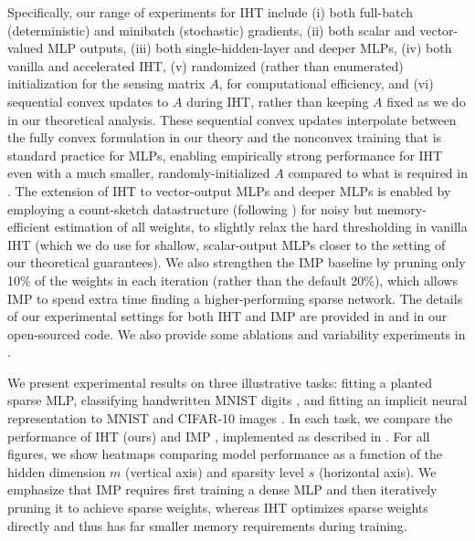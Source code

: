 \documentclass{article} %
\newcommand{\m}{\ensuremath{m}}
\newcommand{\1}{\ensuremath{{\sf (i)}}}
\newcommand{\2}{\ensuremath{{\sf (ii)}}}
\newcommand{\3}{\ensuremath{{\sf (iii)}}}
\newcommand{\4}{\ensuremath{{\sf (iv)}}}
\newcommand{\5}{\ensuremath{{\sf (v)}}}
\newcommand{\6}{\ensuremath{{\sf (vi)}}}
\begin{document}
Specifically, our range of experiments for IHT include (i) both full-batch (deterministic) and minibatch (stochastic) gradients, (ii) both scalar and vector-valued MLP outputs, (iii) both single-hidden-layer and deeper MLPs, (iv) both vanilla and accelerated IHT, (v) randomized (rather than enumerated) initialization for the sensing matrix $A$, for computational efficiency, and (vi) sequential convex updates to $A$ during IHT, rather than keeping $A$ fixed as we do in our theoretical analysis. These sequential convex updates interpolate between the fully convex formulation in our theory and the nonconvex training that is standard practice for MLPs, enabling empirically strong performance for IHT even with a much smaller, randomly-initialized $A$ compared to what is required in . 
The extension of IHT to vector-output MLPs and deeper MLPs is enabled by employing a count-sketch datastructure (following \citet{aghazadeh2018mission}) for noisy but memory-efficient estimation of all weights, to slightly relax the hard thresholding in vanilla IHT (which we do use for shallow, scalar-output MLPs closer to the setting of our theoretical guarantees).
We also strengthen the IMP baseline by pruning only 10\% of the weights in each iteration (rather than the default 20\%), which allows IMP to spend extra time finding a higher-performing sparse network.
The details of our experimental settings for both IHT and IMP are provided in  and in our open-sourced code. We also provide some ablations and variability experiments in .


We present experimental results on three illustrative tasks: fitting a planted sparse MLP, classifying handwritten MNIST digits \citep{deng2012mnist}, and fitting an implicit neural representation to MNIST and CIFAR-10 images \citep{cifar10}. In each task, we compare the performance of IHT (ours) and IMP \citep{frankle2018lottery}, implemented as described in . 
For all figures, we show heatmaps comparing model performance as a function of the hidden dimension $\m$ (vertical axis) and sparsity level $s$ (horizontal axis).
We emphasize that IMP requires first training a dense MLP and then iteratively pruning it to achieve sparse weights, whereas IHT optimizes sparse weights directly and thus has far smaller memory requirements during training. 
\end{document}
